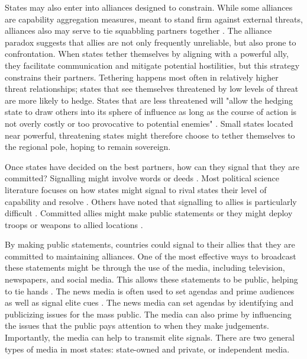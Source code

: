 \documentclass[12pt]{article}
\begin{document}
States may also enter into alliances designed to constrain. While some alliances are capability aggregation measures, meant to stand firm against external threats, alliances also may serve to tie squabbling partners together \autocite{weitsman_dangerous_2004}. The alliance paradox suggests that allies are not only frequently unreliable, but also prone to confrontation. When states tether themselves by aligning with a powerful ally, they facilitate communication and mitigate potential hostilities, but this strategy constrains their partners. Tethering happens most often in relatively higher threat relationships; states that see themselves threatened by low levels of threat are more likely to hedge. States that are less threatened will "allow the hedging state to draw others into its sphere of influence as long as the course of action is not overly costly or too provocative to potential enemies" \autocite{weitsman_dangerous_2004}. Small states located near powerful, threatening states might therefore choose to tether themselves to the regional pole, hoping to remain sovereign. 

Once states have decided on the best partners, how can they signal that they are committed? Signalling might involve words or deeds \autocite{fuhrmann_signaling_2014}. Most political science literature focuses on how states might signal to rival states their level of capability and resolve \autocite{fearon_signaling_1997, kertzer_resolve_2016}. Others have noted that signalling to allies is particularly difficult \autocite{schelling_arms_1967}. Committed allies might make public statements or they might deploy troops or weapons to allied locations \autocite{fuhrmann_signaling_2014, blankenship_trivial_2022}. 

By making public statements, countries could signal to their allies that they are committed to maintaining alliances. One of the most effective ways to broadcast these statements might be through the use of the media, including television, newspapers, and social media. This allows these statements to be public, helping to tie hands \autocite{fearon_signaling_1997}. The news media is often used to set agendas and prime audiences as well as signal elite cues \autocite{iyengar_news_2010, chong_framing_2007}. The news media can set agendas by identifying and publicizing issues for the mass public. The media can also prime by influencing the issues that the public pays attention to when they make judgements. Importantly, the media can help to transmit elite signals. There are two general types of media in most states: state-owned and private, or independent media. 
\end{document}
